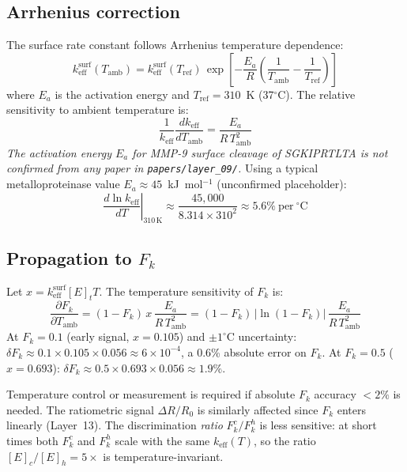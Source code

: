 \documentclass[10pt,a4paper]{article}
\numberwithin{equation}{section}
\newcommand{\keff}{k_{\text{eff}}}
\begin{document}
\subsection{Arrhenius correction}

The surface rate constant follows Arrhenius temperature dependence:
\begin{equation}
  \label{eq:arrhenius}
  \keff^{\text{surf}}(T_{\text{amb}}) = \keff^{\text{surf}}(T_{\text{ref}})\,
  \exp\!\left[-\frac{E_a}{R}\left(\frac{1}{T_{\text{amb}}} - \frac{1}{T_{\text{ref}}}\right)\right]
\end{equation}
where $E_a$ is the activation energy and $T_{\text{ref}} = 310$~K (37$^\circ$C).
The relative sensitivity to ambient temperature is:
\begin{equation}
  \label{eq:arrhenius_sensitivity}
  \frac{1}{\keff}\frac{d\keff}{dT_{\text{amb}}} = \frac{E_a}{R\,T_{\text{amb}}^2}
\end{equation}
\textit{The activation energy $E_a$ for MMP-9 surface cleavage of SGKIPRTLTA is not
confirmed from any paper in \texttt{papers/layer\_09/}.} Using a typical
metalloproteinase value $E_a \approx 45$~kJ~mol$^{-1}$ (unconfirmed placeholder):
\begin{equation}
  \left.\frac{d\ln\keff}{dT}\right|_{310\,\text{K}}
  \approx \frac{45{,}000}{8.314 \times 310^2} \approx 5.6\%\ \text{per}\ {}^\circ\text{C}
  \label{eq:temp_sensitivity}
\end{equation}

\subsection{Propagation to $F_k$}

Let $x = \keff^{\text{surf}}[E]_t T$. The temperature sensitivity of $F_k$ is:
\begin{equation}
  \label{eq:dFdT}
  \frac{\partial F_k}{\partial T_{\text{amb}}} = (1-F_k)\,x\,\frac{E_a}{R\,T_{\text{amb}}^2}
  = (1-F_k)\,\left|\ln(1-F_k)\right|\,\frac{E_a}{R\,T_{\text{amb}}^2}
\end{equation}
At $F_k = 0.1$ (early signal, $x = 0.105$) and $\pm 1^\circ$C uncertainty:
$\delta F_k \approx 0.1 \times 0.105 \times 0.056 \approx 6\times10^{-4}$,
a 0.6\% absolute error on $F_k$. At $F_k = 0.5$ ($x = 0.693$):
$\delta F_k \approx 0.5 \times 0.693 \times 0.056 \approx 1.9\%$.

Temperature control or measurement is required if absolute $F_k$ accuracy
$< 2\%$ is needed. The ratiometric signal $\Delta R/R_0$ is similarly affected
since $F_k$ enters linearly (Layer~13). The discrimination \emph{ratio}
$F_k^c/F_k^h$ is less sensitive: at short times both $F_k^c$ and $F_k^h$ scale
with the same $\keff(T)$, so the ratio $[E]_c/[E]_h = 5\times$ is temperature-invariant.
\end{document}
